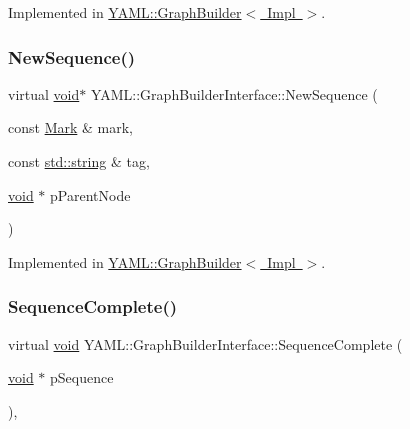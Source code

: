 Implemented in \mbox{\hyperlink{class_y_a_m_l_1_1_graph_builder_a8601c82a8c24fd4bb2e9e84b5f5d3316}{Y\+A\+M\+L\+::\+Graph\+Builder$<$ Impl $>$}}.

\mbox{\label{class_y_a_m_l_1_1_graph_builder_interface_a050ae61f3dc8e92015061d2a7af205f0}} 
\subsubsection{\texorpdfstring{NewSequence()}{NewSequence()}}
{\footnotesize\ttfamily virtual \mbox{\hyperlink{glad_8h_a950fc91edb4504f62f1c577bf4727c29}{void}}$\ast$ Y\+A\+M\+L\+::\+Graph\+Builder\+Interface\+::\+New\+Sequence (\begin{DoxyParamCaption}\item[{const \mbox{\hyperlink{struct_y_a_m_l_1_1_mark}{Mark}} \&}]{mark,  }\item[{const \mbox{\hyperlink{glad_8h_ac83513893df92266f79a515488701770}{std\+::string}} \&}]{tag,  }\item[{\mbox{\hyperlink{glad_8h_a950fc91edb4504f62f1c577bf4727c29}{void}} $\ast$}]{p\+Parent\+Node }\end{DoxyParamCaption})\hspace{0.3cm}{\ttfamily [pure virtual]}}



Implemented in \mbox{\hyperlink{class_y_a_m_l_1_1_graph_builder_abfe9a35d5d8c61577234fbaaf9b0c5ef}{Y\+A\+M\+L\+::\+Graph\+Builder$<$ Impl $>$}}.

\mbox{\label{class_y_a_m_l_1_1_graph_builder_interface_a4e27895405da48ca9e67a3636f4cbd03}} 
\subsubsection{\texorpdfstring{SequenceComplete()}{SequenceComplete()}}
{\footnotesize\ttfamily virtual \mbox{\hyperlink{glad_8h_a950fc91edb4504f62f1c577bf4727c29}{void}} Y\+A\+M\+L\+::\+Graph\+Builder\+Interface\+::\+Sequence\+Complete (\begin{DoxyParamCaption}\item[{\mbox{\hyperlink{glad_8h_a950fc91edb4504f62f1c577bf4727c29}{void}} $\ast$}]{p\+Sequence }\end{DoxyParamCaption})\hspace{0.3cm}{\ttfamily [inline]}, {\ttfamily [virtual]}}



